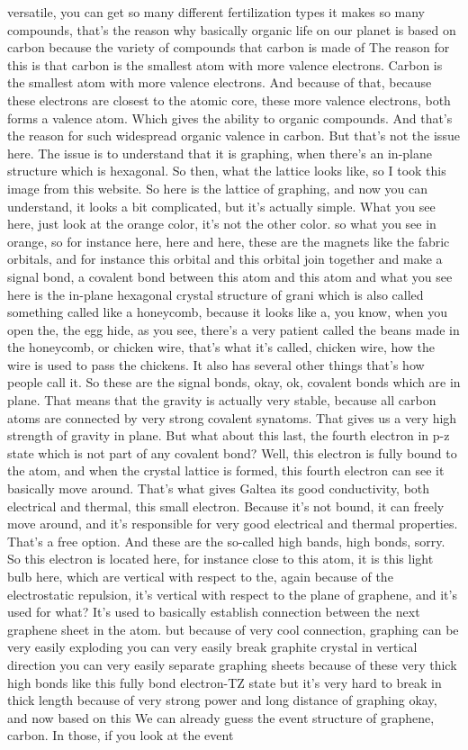 versatile, you can get so many different fertilization types it makes so many compounds, that's the reason why basically organic life on our planet is based on carbon because the variety of compounds that carbon is made of The reason for this is that carbon is the smallest atom with more valence electrons. Carbon is the smallest atom with more valence electrons. And because of that, because these electrons are closest to the atomic core, these more valence electrons, both forms a valence atom. Which gives the ability to organic compounds. And that's the reason for such widespread organic valence in carbon. But that's not the issue here. The issue is to understand that it is graphing, when there's an in-plane structure which is hexagonal. So then, what the lattice looks like, so I took this image from this website. So here is the lattice of graphing, and now you can understand, it looks a bit complicated, but it's actually simple. What you see here, just look at the orange color, it's not the other color. so what you see in orange, so for instance here, here and here, these are the magnets like the fabric orbitals, and for instance this orbital and this orbital join together and make a signal bond, a covalent bond between this atom and this atom and what you see here is the in-plane hexagonal crystal structure of grani which is also called something called like a honeycomb, because it looks like a, you know, when you open the, the egg hide, as you see, there's a very patient called the beans made in the honeycomb, or chicken wire, that's what it's called, chicken wire, how the wire is used to pass the chickens. It also has several other things that's how people call it. So these are the signal bonds, okay, ok, covalent bonds which are in plane. That means that the gravity is actually very stable, because all carbon atoms are connected by very strong covalent synatoms. That gives us a very high strength of gravity in plane. But what about this last, the fourth electron in p-z state which is not part of any covalent bond? Well, this electron is fully bound to the atom, and when the crystal lattice is formed, this fourth electron can see it basically move around. That's what gives Galtea its good conductivity, both electrical and thermal, this small electron. Because it's not bound, it can freely move around, and it's responsible for very good electrical and thermal properties. That's a free option. And these are the so-called high bands, high bonds, sorry. So this electron is located here, for instance close to this atom, it is this light bulb here, which are vertical with respect to the, again because of the electrostatic repulsion, it's vertical with respect to the plane of graphene, and it's used for what? It's used to basically establish connection between the next graphene sheet in the atom. but because of very cool connection, graphing can be very easily exploding you can very easily break graphite crystal in vertical direction you can very easily separate graphing sheets because of these very thick high bonds like this fully bond electron-TZ state but it's very hard to break in thick length because of very strong power and long distance of graphing okay, and now based on this We can already guess the event structure of graphene, carbon. In those, if you look at the event 
